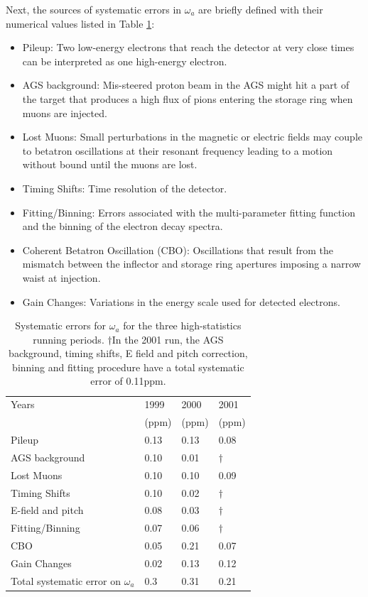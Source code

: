 \documentclass{outhesis}
\begin{document}
Next, the sources of systematic errors in $\omega_a$ are briefly defined with their numerical values listed in Table \ref{tab:sys}:
\begin{itemize}
\item Pileup: Two low-energy electrons that reach the detector at very close times can be interpreted as one high-energy electron.        
\item AGS background: Mis-steered proton beam in the AGS might hit a part of the target that produces a high flux of pions entering the storage ring when muons are injected. %
\item Lost Muons: Small perturbations in the magnetic or electric fields may couple to betatron oscillations at their resonant frequency leading to a motion without bound until the muons are lost.
\item Timing Shifts: Time resolution of the detector. %
\item Fitting/Binning: Errors associated with the multi-parameter fitting function and the binning of the electron decay spectra. 
\item Coherent Betatron Oscillation (CBO): Oscillations that result from the mismatch between the inflector and storage ring apertures imposing a narrow waist at injection. %
\item Gain Changes: Variations in the energy scale used for detected electrons.
\end{itemize}
\begin{table}
  \caption{ Systematic errors for $\omega_a$ for the three high-statistics running periods. ${\dagger}$In the 2001 run, the AGS background, timing shifts, E field and pitch correction, binning and fitting procedure have a total systematic error of 0.11ppm. }
  \label{tab:sys}
  \centering
  \begin{tabular}{*{4}{l}}
	\hline \hline
      Years   & 1999 & 2000  & 2001 \\ 
       & (ppm) & (ppm) & (ppm)\\
      \hline
       Pileup & 0.13 & 0.13 & 0.08  \\
       AGS background & 0.10 & 0.01 &    ${\dagger}$\\
       Lost Muons & 0.10 & 0.10 & 0.09  \\
       Timing Shifts & 0.10 & 0.02 &    ${\dagger}$\\
       E-field and pitch & 0.08 & 0.03 &    ${\dagger}$\\
       Fitting/Binning & 0.07 & 0.06 &    ${\dagger}$\\
       CBO  & 0.05 & 0.21 & 0.07  \\
       Gain Changes & 0.02 & 0.13 & 0.12   \\ \hline
       Total systematic error on $\omega_a$ & 0.3 & 0.31 & 0.21  \\
         \hline  \hline
     \end{tabular}
\end{table}
\end{document}
